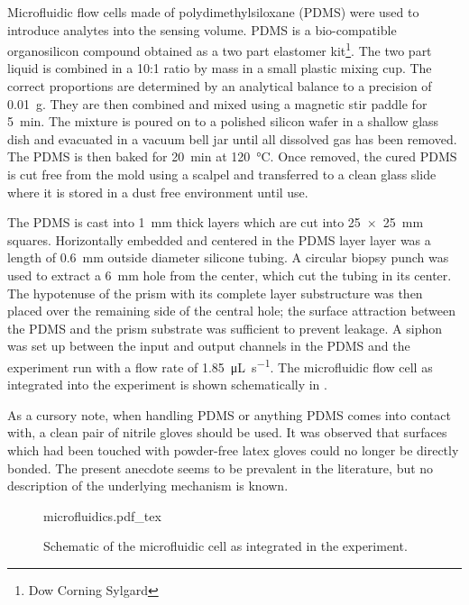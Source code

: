 Microfluidic flow cells made of polydimethylsiloxane (PDMS) were used to
introduce analytes into the sensing volume.  PDMS is a bio-compatible
organosilicon compound obtained as a two part elastomer kit\footnote{Dow
Corning Sylgard}.  The two part liquid is combined in a
10:1 ratio by mass in a small plastic mixing cup.  The correct proportions
are determined by an analytical balance to a precision of \SI{0.01}{\gram}.
They are then combined and mixed using a magnetic stir paddle for
\SI{5}{\minute}.  The mixture is poured on to a polished silicon wafer in a
shallow glass dish and evacuated in a vacuum bell jar until all dissolved
gas has been removed.  The PDMS is then baked for \SI{20}{\minute} at
\SI{120}{\celsius}.  Once removed, the cured PDMS is cut free from the mold
using a scalpel and transferred to a clean glass slide where it is stored
in a dust free environment until use.

The PDMS is cast into \SI{1}{\milli\meter} thick layers which are cut into
\SI{25x25}{\milli\meter} squares.  Horizontally embedded and centered in the
PDMS layer layer was a length of \SI{0.6}{\milli\meter} outside diameter
silicone tubing.  A circular biopsy punch was used to extract a
\SI{6}{\milli\meter} hole from the center, which cut the tubing in its center.
The hypotenuse of the prism with its complete layer substructure was then
placed over the remaining side of the central hole; the surface attraction
between the PDMS and the prism substrate was sufficient to prevent leakage.  A
siphon was set up between the input and output channels in the PDMS and the
experiment run with a flow rate of \SI{1.85}{\micro\liter\per\second}.  The
microfluidic flow cell as integrated into the experiment is shown schematically
in .

As a cursory note, when handling PDMS or anything PDMS comes into contact
with, a clean pair of nitrile gloves should be used.  It was observed that
surfaces which had been touched with powder-free latex gloves could no
longer be directly bonded.  The present anecdote seems to be prevalent in
the literature, but no description of the underlying mechanism is known.

\begin{figure}[ht]
\centering
{microfluidics.pdf_tex}
\caption{Schematic of the microfluidic cell as integrated in the experiment.}
\label{fig:microfluidiccell}
\end{figure}
